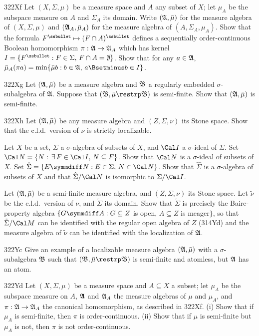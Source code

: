 {\spheader 322Xf Let $(X,\Sigma,\mu)$ be a measure space and $A$ any
subset of $X$;  let $\mu_A$ be the subspace measure on $A$ and
$\Sigma_A$ its domain.   Write $(\frak A,\bar\mu)$ for the measure
algebra of $(X,\Sigma,\mu)$ and $(\frak A_A,\bar\mu_A)$ for the
measure algebra of $(A,\Sigma_A,\mu_A)$.   Show that the formula
$F^{\ssbullet}\mapsto (F\cap A)^{\ssbullet}$ defines a
sequentially order-continuous Boolean homomorphism
$\pi:\frak A\to\frak A_A$ which has kernel
$I=\{F^{\ssbullet}:F\in\Sigma,\,F\cap A=\emptyset\}$.
Show that for any $a\in\frak A$,
$\bar\mu_A(\pi a)=\min\{\bar\mu b:b\in\frak A,\,a\Bsetminus b\in I\}$.

\spheader 322Xg Let $(\frak A,\bar\mu)$ be a measure algebra and
$\frak B$ a regularly embedded $\sigma$-subalgebra of $\frak A$.
Suppose that
$(\frak B,\bar\mu\restrp\frak{B})$ is semi-finite.   Show that
$(\frak A,\bar\mu)$ is semi-finite.

\spheader 322Xh Let $(\frak A,\bar\mu)$ be any measure algebra and
$(Z,\Sigma,\nu)$ its Stone space.   Show that the c.l.d.\ version of
$\nu$ is strictly localizable.

 Let $X$ be a set, $\Sigma$ a
$\sigma$-algebra of subsets of $X$, and $\Cal I$ a $\sigma$-ideal of
$\Sigma$.   Set $\Cal N=\{N:\,\exists\,F\in\Cal I,\,N\subseteq F\}$.
Show that $\Cal N$ is a $\sigma$-ideal of subsets of $X$.   Set
$\hat\Sigma=\{E\symmdiff N:E\in\Sigma,\,N\in\Cal N\}$.   Show that
$\hat\Sigma$ is a $\sigma$-algebra of subsets of $X$ and that
$\hat\Sigma/\Cal N$ is isomorphic to $\Sigma/\Cal I$.

 Let $(\frak A,\bar\mu)$ be a semi-finite measure
algebra, and $(Z,\Sigma,\nu)$ its Stone space.   Let $\tilde\nu$ be the
c.l.d.\ version of $\nu$, and $\tilde\Sigma$ its domain.   Show that
$\tilde\Sigma$ is precisely the Baire-property algebra
$\{G\symmdiff A:G\subseteq Z$ is open, $A\subseteq Z$ is meager$\}$, so
that $\tilde\Sigma/\Cal M$ can be
identified with the regular open algebra of $Z$ (314Yd) and the measure
algebra of $\tilde\nu$ can be identified with the localization of
$\frak A$.

\spheader 322Yc Give an example of a localizable measure algebra
$(\frak A,\bar\mu)$ with a $\sigma$-subalgebra $\frak B$ such that
$(\frak B,\bar\mu\restrp\frak{B})$ is semi-finite and atomless, but
$\frak A$ has an atom.

\spheader 322Yd Let $(X,\Sigma,\mu)$ be a measure space and
$A\subseteq X$ a subset;  let $\mu_A$ be the subspace measure on $A$,
$\frak A$ and $\frak A_A$ the measure algebras of $\mu$ and $\mu_A$, and
$\pi:\frak A\to\frak A_A$ the canonical homomorphism, as described in
322Xf.   (i) Show that if
$\mu_A$ is semi-finite, then $\pi$ is order-continuous.   (ii) Show that
if $\mu$ is semi-finite but $\mu_A$ is not, then $\pi$ is not
order-continuous.

}

